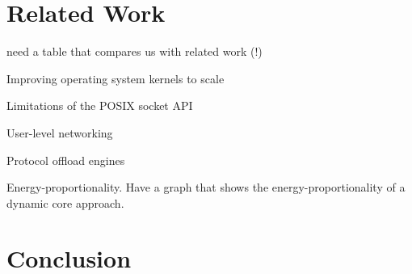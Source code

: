 \section{Related Work}

\todo need a table that compares us with related work (!)

\todo Improving operating system kernels to scale

\todo Limitations of the POSIX socket API

\todo User-level networking

\todo Protocol offload engines

\todo Energy-proportionality.   Have a graph that shows the energy-proportionality of a dynamic core approach.

\section{Conclusion}




